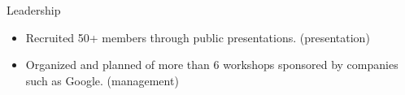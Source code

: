 \documentclass{resume} %
\begin{document}
\begin{workSection}{Leadership}
    \customItem[
        title=Association for Computing Machinery,
        keyHighlight=Multiple leadership roles{,} including publicity offier \& treasurer),
        duration=Fall 2022 - Present
    ]
    \begin{itemize}
        \vspace{-0.5em}
        \itemsep -6pt {}
        \item Recruited 50+ members through public presentations. (presentation)
        \item Organized and planned of more than 6 workshops sponsored by companies such as Google. (management)
    \end{itemize}
\end{workSection}
\end{document}
